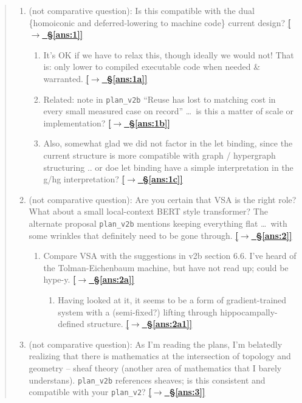 \documentclass[12pt]{article}
\newcommand{\qtoans}[2]{\hyperref[#1]{\textcolor{qpurple}{\textbf{\small[\(\rightarrow\)~#2]}}}}
\begin{document}
\begin{quote}
\begin{enumerate}[label=\arabic*., leftmargin=1.8em, itemsep=0.25em]
  \item \hypertarget{q:1}{}(not comparative question): Is this compatible with the dual \{homoiconic and deferred-lowering to machine code\} current design? \qtoans{ans:1}{\S\ref{ans:1}}
  \begin{enumerate}[label=\alph*., leftmargin=1.6em, itemsep=0.15em]
    \item \hypertarget{q:1a}{}It's OK if we have to relax this, though ideally we would not! That is: only lower to compiled executable code when needed \& warranted. \qtoans{ans:1a}{\S\ref{ans:1a}}
    \item \hypertarget{q:1b}{}Related: note in \texttt{plan\_v2b} ``Reuse has lost to matching cost in every small measured case on record'' \dots\ is this a matter of scale or implementation? \qtoans{ans:1b}{\S\ref{ans:1b}}
    \item \hypertarget{q:1c}{}Also, somewhat glad we did not factor in the let binding, since the current structure is more compatible with graph / hypergraph structuring .. or doe let binding have a simple interpretation in the g/hg interpretation? \qtoans{ans:1c}{\S\ref{ans:1c}}
  \end{enumerate}

  \item \hypertarget{q:2}{}(not comparative question): Are you certain that VSA is the right role? What about a small local-context BERT style transformer? The alternate proposal \texttt{plan\_v2b} mentions keeping everything flat \dots\ with some wrinkles that definitely need to be gone through. \qtoans{ans:2}{\S\ref{ans:2}}
  \begin{enumerate}[label=\alph*., leftmargin=1.6em, itemsep=0.15em]
    \item \hypertarget{q:2a}{}Compare VSA with the suggestions in v2b section 6.6. I've heard of the Tolman-Eichenbaum machine, but have not read up; could be hype-y. \qtoans{ans:2a}{\S\ref{ans:2a}}
    \begin{enumerate}[label=\arabic*., leftmargin=1.6em]
      \item \hypertarget{q:2a1}{}Having looked at it, it seems to be a form of gradient-trained system with a (semi-fixed?) lifting through hippocampally-defined structure. \qtoans{ans:2a1}{\S\ref{ans:2a1}}
    \end{enumerate}
  \end{enumerate}

  \item \hypertarget{q:3}{}(not comparative question): As I'm reading the plans, I'm belatedly realizing that there is mathematics at the intersection of topology and geometry -- sheaf theory (another area of mathematics that I barely understans). \texttt{plan\_v2b} references sheaves; is this consistent and compatible with your \texttt{plan\_v2}? \qtoans{ans:3}{\S\ref{ans:3}}


\end{enumerate}
\end{quote}
\end{document}
